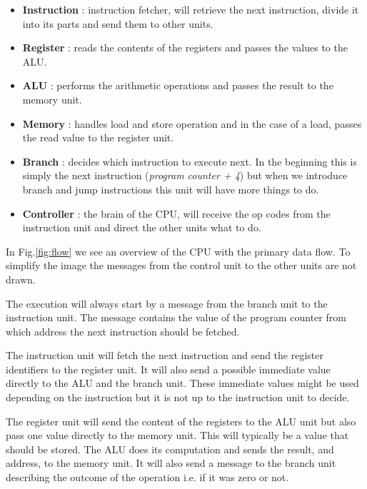\documentclass[a4paper,11pt]{article}
\begin{document}
\begin{itemize}

\item {\bf Instruction} : instruction fetcher, will retrieve the next
  instruction, divide it into its parts and send them to other units.

\item {\bf Register} : reads the contents of the registers
  and passes the values to the ALU.

\item {\bf ALU} : performs the arithmetic operations and passes the
  result to the memory unit.

\item {\bf Memory} : handles load and store operation and in the case
  of a load, passes the read value to the register unit.

\item {\bf Branch} : decides which instruction to execute next. In the
  beginning this is simply the next instruction ({\em program counter
    + 4}) but when we introduce branch and jump instructions this unit
  will have more things to do.

\item {\bf Controller} : the brain of the CPU, will receive the op
  codes from the instruction unit and direct the other units what to do.
  
\end{itemize}

In Fig.\ref{fig:flow} we see an overview of the CPU with the primary
data flow. To simplify the image the messages from the control unit
to the other units are not drawn.

The execution will always start by a message from the branch unit to
the instruction unit. The message contains the value of the program
counter from which address the next instruction should be fetched.

The instruction unit will fetch the next instruction and send the
register identifiers to the register unit. It will also send a
possible immediate value directly to the ALU and the branch
unit. These immediate values might be used depending on the
instruction but it is not up to the instruction unit to decide.

The register unit will send the content of the registers to the ALU
unit but also pass one value directly to the memory unit. This will
typically be a value that should be stored. The ALU does its
computation and sends the result, and address, to the memory unit. It
will also send a message to the branch unit describing the outcome of
the operation i.e. if it was zero or not.
\end{document}
